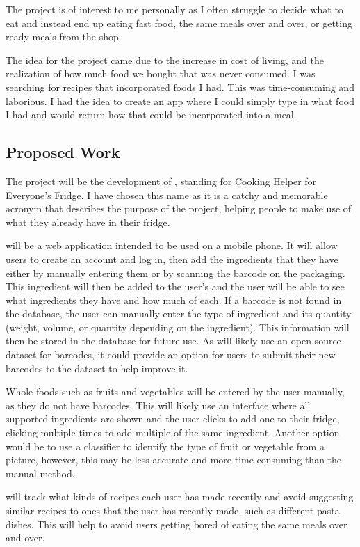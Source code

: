 \documentclass[../CHEFCookingHelper.tex]{subfiles}
\begin{document}
The project is of interest to me personally as I often struggle to decide what to eat and instead end up eating fast food,
the same meals over and over, or getting ready meals from the shop.

The idea for the project came due to the increase in cost of living, and the realization of how much food we bought that was
never consumed. I was searching for recipes that incorporated foods I had. This was time-consuming and laborious.
I had the idea to create an app where I could simply type in what food I had and would return how that could be incorporated
into a meal.

\subsection{Proposed Work}
The project will be the development of \chef{}, standing for Cooking Helper for Everyone's Fridge. I have chosen this name
as it is a catchy and memorable acronym that describes the purpose of the project, helping people to make use of
what they already have in their fridge.

\chef{} will be a web application intended to be used on a mobile phone. It will allow users to create an account and log in,
then add the ingredients that they have either by manually entering them or by scanning the barcode on the packaging.
This ingredient will then be added to the user's \virtualfridge and the user will be able to see what ingredients they have and how much of each.
If a barcode is not found in the database, the user can manually enter the type of ingredient and its quantity (weight, volume, or quantity depending on the ingredient).
This information will then be stored in the database for future use. As \chef{} will likely use an open-source dataset for barcodes, it could provide an option
for users to submit their new barcodes to the dataset to help improve it.

Whole foods such as fruits and vegetables will be entered by the user manually, as they do not have barcodes. This will likely use an interface where
all supported ingredients are shown and the user clicks to add one to their fridge, clicking multiple times to add multiple of the same ingredient.
Another option would be to use a classifier to identify the type of fruit or vegetable from a picture, however, this may be less accurate and more
time-consuming than the manual method.

\chef{} will track what kinds of recipes each user has made recently and avoid suggesting similar recipes
to ones that the user has recently made, such as different pasta dishes. This will help to avoid users
getting bored of eating the same meals over and over.
\end{document}
